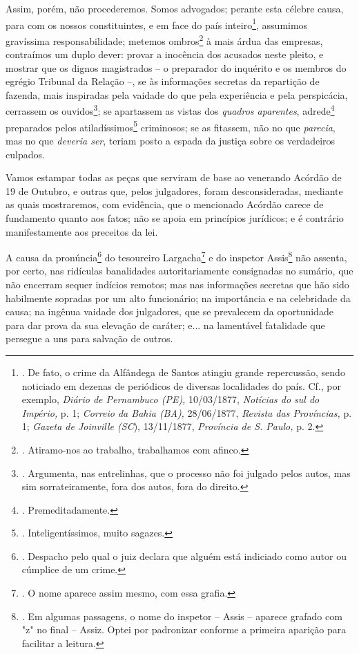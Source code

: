 Assim, porém, não procederemos. Somos advogados; perante esta célebre
causa, para com os nossos constituintes, e em face do país
inteiro\footnote{. De fato, o crime da Alfândega de Santos atingiu
  grande repercussão, sendo noticiado em dezenas de periódicos de
  diversas localidades do país. Cf., por exemplo, \emph{Diário de
  Pernambuco (PE),} 10/03/1877, \emph{Notícias do sul do Império,} p. 1;
  \emph{Correio da Bahia (BA),} 28/06/1877, \emph{Revista das
  Províncias,} p. 1; \emph{Gazeta de Joinville (SC}), 13/11/1877,
  \emph{Província de S. Paulo,} p. 2.}, assumimos gravíssima
responsabilidade; metemos ombros\footnote{. Atiramo-nos ao trabalho,
  trabalhamos com afinco.} à mais árdua das empresas, contraímos um
duplo dever: provar a inocência dos acusados neste pleito, e mostrar que
os dignos magistrados -- o preparador do inquérito e os membros do
egrégio Tribunal da Relação --, se às informações secretas da repartição
de fazenda, mais inspiradas pela vaidade do que pela experiência e pela
perspicácia, cerrassem os ouvidos\footnote{. Argumenta, nas entrelinhas,
  que o processo não foi julgado pelos autos, mas sim sorrateiramente,
  fora dos autos, fora do direito.}; se apartassem as vistas dos
\emph{quadros aparentes}, adrede\footnote{. Premeditadamente.}
preparados pelos atiladíssimos\footnote{. Inteligentíssimos, muito
  sagazes.} criminosos; se as fitassem, não no que \emph{parecia}, mas
no que \emph{deveria ser}, teriam posto a espada da justiça sobre os
verdadeiros culpados.

Vamos estampar todas as peças que serviram de base ao venerando Acórdão
de 19 de Outubro, e outras que, pelos julgadores, foram desconsideradas,
mediante as quais mostraremos, com evidência, que o mencionado Acórdão
carece de fundamento quanto aos fatos; não se apoia em princípios
jurídicos; e é contrário manifestamente aos preceitos da lei.

A causa da pronúncia\footnote{. Despacho pelo qual o juiz declara que
  alguém está indiciado como autor ou cúmplice de um crime.} do
tesoureiro Largacha\footnote{. O nome aparece assim mesmo, com essa
  grafia.} e do inspetor Assis\footnote{. Em algumas passagens, o nome
  do inspetor -- Assis -- aparece grafado com "z" no final -- Assiz.
  Optei por padronizar conforme a primeira aparição para facilitar a
  leitura.} não assenta, por certo, nas ridículas banalidades
autoritariamente consignadas no sumário, que não encerram sequer
indícios remotos; mas nas informações secretas que hão sido habilmente
sopradas por um alto funcionário; na importância e na celebridade da
causa; na ingênua vaidade dos julgadores, que se prevalecem da
oportunidade para dar prova da sua elevação de caráter; e... na
lamentável fatalidade que persegue a uns para salvação de outros.


